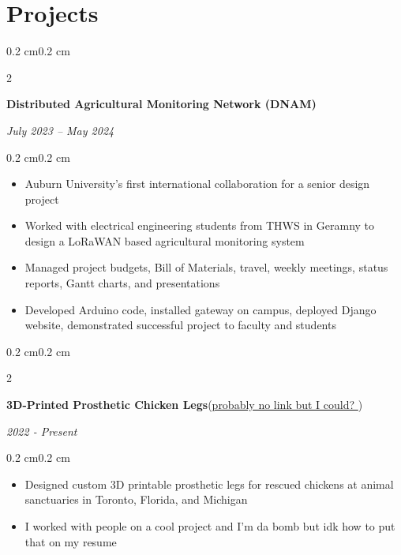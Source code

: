\documentclass[10pt, letterpaper]{article}
\newenvironment{highlights}{
    \begin{itemize}[topsep=0.10 cm,parsep=0.10 cm,partopsep=0pt,itemsep=0pt,leftmargin=0.4 cm + 10pt]
}{
    \end{itemize}
}
\newenvironment{onecolentry}{
    \begin{adjustwidth}{0.2 cm}{0.2 cm}
}{
    \end{adjustwidth}
}
\newenvironment{twocolentry}[2][]{
    \onecolentry
    \def\secondColumn{#2}
    \setcolumnwidth{\fill, 4.5 cm}
    \begin{paracol}{2}
}{
    \switchcolumn \raggedleft \secondColumn
    \end{paracol}
    \endonecolentry
}
\let\hrefWithoutArrow\href
\renewcommand{\href}[2]{\hrefWithoutArrow{#1}{#2 \raisebox{.15ex}{\footnotesize \faExternalLink*}}}
\begin{document}
    \section{Projects}
        \begin{twocolentry}{\textit{July 2023 – May 2024}}
            \textbf{Distributed Agricultural Monitoring Network (DNAM)}
        \end{twocolentry}
        \vspace{0.10 cm}
        \begin{onecolentry}
            \begin{highlights}
                \item Auburn University's first international collaboration for a senior design project
                \item Worked with electrical engineering students from THWS in Geramny to design a LoRaWAN based agricultural monitoring system
                \item Managed project budgets, Bill of Materials, travel, weekly meetings, status reports, Gantt charts, and presentations
                \item Developed Arduino code, installed gateway on campus, deployed Django website, demonstrated successful project to faculty and students
            \end{highlights}
        \end{onecolentry}

        \vspace{0.2 cm}

        \begin{twocolentry}{\textit{2022 - Present}}
            \textbf{3D-Printed Prosthetic Chicken Legs}(\href{https://example.com}{probably no link but I could?})
        \end{twocolentry}
        \vspace{0.10 cm}
        \begin{onecolentry}
            \begin{highlights}
                \item Designed custom 3D printable prosthetic legs for rescued chickens at animal sanctuaries in Toronto, Florida, and Michigan
                \item I worked with people on a cool project and I'm da bomb but idk how to put that on my resume
            \end{highlights}
        \end{onecolentry}
\end{document}

